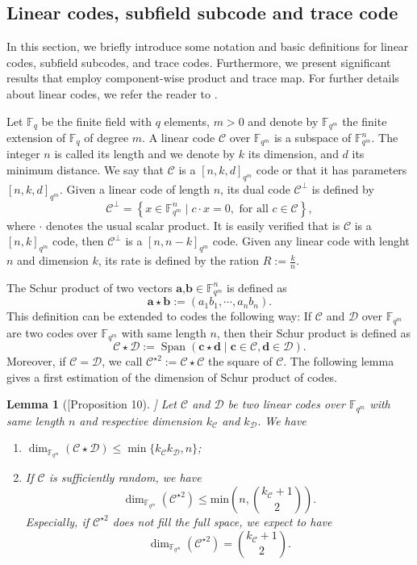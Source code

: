 \documentclass[a4paper]{article}
\newtheorem{lemma}[thm]{Lemma}
\theoremstyle{definition}
\theoremstyle{remark}
\newcommand{\calC}{\mathcal{C}}
\newcommand{\calD}{\mathcal{D}}
\newcommand{\fqm}{\mathbb{F}_{q^m}}
\newcommand{\fq}{\mathbb{F}_{q}}
\newcommand{\Span}[1]{\operatorname{Span}\left(#1\right)}
\newcommand\TODO[1]{\textcolor{red}{TO DO: #1}}
\begin{document}
\subsection{Linear codes, subfield subcode and trace code}


In this section, we briefly introduce some notation and basic definitions for linear codes, subfield subcodes, and trace codes. Furthermore, we present significant results that employ component-wise product and trace map. For further details about linear codes, we refer the reader to \cite{MS86}.

\noindent Let $\fq$ be the finite field with $q$ elements, $m > 0$ and denote  by $\fqm$ the finite extension of $\fq$ of degree $m$. A linear code $\calC$ over $\fqm$ is a subspace of $\fqm^n$. The integer $n$ is called its length and we denote by $k$ its dimension, and $d$ its minimum distance. We say that $\calC$ is a $[n,k,d]_{q^m}$ code or that it has parameters $[n,k,d]_{q^m}$. Given a linear code of length $n$, its dual code $\calC^{\perp}$ is defined by 
\[\calC^{\perp}=\left\lbrace x \in \fqm^n \mid c \cdot x=0, \text{ for all } c \in \calC \right\rbrace,\]  
where $\cdot$ denotes the usual scalar product. It is easily verified that is $\calC$ is a $[n,k]_{q^m}$ code, then $\calC^{\perp}$ is a $[n,n-k]_{q^m}$ code.
Given any linear code with lenght $n$ and dimension $k$, its rate is defined by the ration $R := \frac{k}{n}$.

\noindent The Schur product of two vectors $\mathbf{a}$,$\mathbf{b} \in \fqm^n$ is defined as 
\[ \mathbf{a} \star \mathbf{b} := (a_1b_1,\cdots,a_nb_n). \]
This definition can be extended to codes the following way: If $\calC$ and $\calD$ over $\fqm$ are two codes over $\fqm$ with same length $n$, then their Schur product is defined as
\[ \calC \star \calD := \Span{\mathbf{c} \star \mathbf{d} \mid \mathbf{c} \in \calC, \mathbf{d} \in \calD}. \]
Moreover, if $\calC = \calD$, we call $\calC^{\star 2} := \calC \star \calC$ the square of $\calC$. The following lemma gives a first estimation of the dimension of Schur product of codes.

\begin{lemma}[\cite{MT21}[Proposition 10]] \label{lem:known_bounds}
Let $\calC$ and $\calD$ be two linear codes over $\fqm$ with same length $n$ and respective dimension $k_{\calC}$ and $k_{\calD}$. We have
\begin{enumerate}
	\item $\dim_{\fqm}(\calC \star \calD) \leq \min\{k_{\calC}k_{\calD},n\}$;
	\item If $\calC$ is sufficiently random, we have
\[ \dim_{\mathbb{F}_{q^m}}(\calC^{\star2}) \leq \mathrm{min}\left(n,\binom{k_{\calC}+1}{2}\right) . \]
Especially, if $\calC^{\star2}$ does not fill the full space, we expect to have 
	\[ \dim_{\fqm}(\calC^{\star2}) = \binom{k_{\calC}+1}{2}.\]
	\end{enumerate}
\end{lemma}
\end{document}
